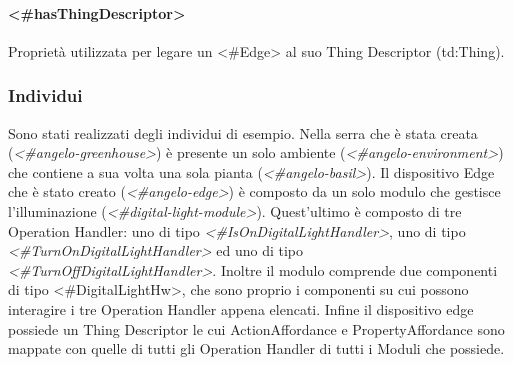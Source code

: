 \paragraph{<\#hasThingDescriptor>}
Proprietà utilizzata per legare un <\#Edge> al suo Thing Descriptor (td:Thing).

\subsubsection{Individui}
Sono stati realizzati degli individui di esempio. Nella serra che è stata creata (\textit{<\#angelo-greenhouse>}) è presente un solo ambiente (\textit{<\#angelo-environment>}) che contiene a sua volta una sola pianta (\textit{<\#angelo-basil>}). Il dispositivo Edge che è stato creato (\textit{<\#angelo-edge>}) è composto da un solo modulo che gestisce l'illuminazione (\textit{<\#digital-light-module>}). Quest'ultimo è composto di tre Operation Handler: uno di tipo \textit{<\#IsOnDigitalLightHandler>}, uno di tipo \textit{<\#TurnOnDigitalLightHandler>} ed uno di tipo \textit{<\#TurnOffDigitalLightHandler>}.
Inoltre il modulo comprende due componenti di tipo <\#DigitalLightHw>, che sono proprio i componenti su cui possono interagire i tre Operation Handler appena elencati. Infine il dispositivo edge possiede un Thing Descriptor le cui ActionAffordance e PropertyAffordance sono mappate con quelle di tutti gli Operation Handler di tutti i Moduli che possiede.
